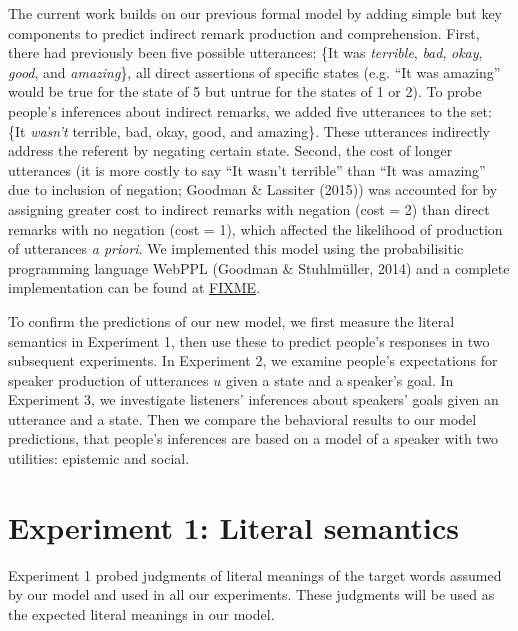 \documentclass[10pt, letterpaper]{article}
\begin{document}
The current work builds on our previous formal model by adding simple
but key components to predict indirect remark production and
comprehension. First, there had previously been five possible
utterances: \{It was \emph{terrible}, \emph{bad}, \emph{okay},
\emph{good}, and \emph{amazing}\}, all direct assertions of specific
states (e.g. ``It was amazing'' would be true for the state of 5 but
untrue for the states of 1 or 2). To probe people's inferences about
indirect remarks, we added five utterances to the set: \{It
\emph{wasn't} terrible, bad, okay, good, and amazing\}. These utterances
indirectly address the referent by negating certain state. Second, the
cost of longer utterances (it is more costly to say ``It wasn't
terrible'' than ``It was amazing'' due to inclusion of negation; Goodman
\& Lassiter (2015)) was accounted for by assigning greater cost to
indirect remarks with negation (cost = 2) than direct remarks with no
negation (cost = 1), which affected the likelihood of production of
utterances \emph{a priori}. We implemented this model using the
probabilisitic programming language WebPPL (Goodman \& Stuhlmüller,
2014) and a complete implementation can be found at \url{FIXME}.

To confirm the predictions of our new model, we first measure the
literal semantics in Experiment 1, then use these to predict people's
responses in two subsequent experiments. In Experiment 2, we examine
people's expectations for speaker production of utterances \(u\) given a
state and a speaker's goal. In Experiment 3, we investigate listeners'
inferences about speakers' goals given an utterance and a state. Then we
compare the behavioral results to our model predictions, that people's
inferences are based on a model of a speaker with two utilities:
epistemic and social.

\section{Experiment 1: Literal
semantics}\label{experiment-1-literal-semantics}

Experiment 1 probed judgments of literal meanings of the target words
assumed by our model and used in all our experiments. These judgments
will be used as the expected literal meanings in our model.
\end{document}
